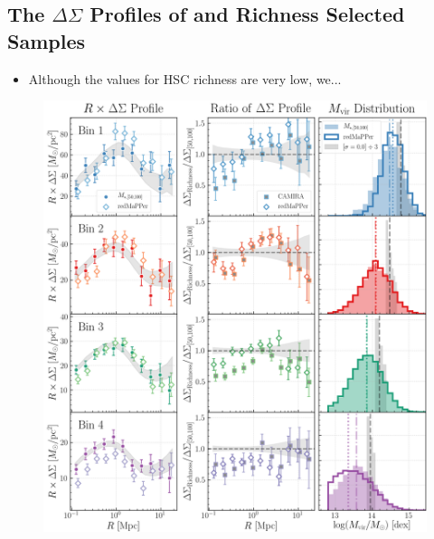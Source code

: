 \documentclass[a4paper,fleqn,usenatbib]{mnras}
\begin{document}
\subsection{The $\Delta\Sigma$ Profiles of \mstar{} and Richness Selected Samples}
    \label{sec:mstar_vs_richness}


    \begin{itemize}

        \item Although the \sighalo{} values for HSC \redm{} richness are very low, we... 

    \end{itemize}

  \begin{figure}
      \centering
      \includegraphics[width=\textwidth]{figure/topn_dsigma_mout6_redm_compare}
      \caption{
          }
      \label{fig:mout_richness}
  \end{figure}
\end{document}
